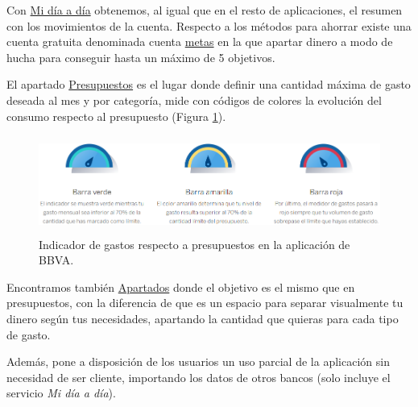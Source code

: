 \begin{itemize}
    Con 
    \href{https://www.bbva.es/personas/banca-online/control-gastos-mi-dia-a-dia.html}{Mi día a día}
    obtenemos, al igual que en el resto de aplicaciones, el resumen con los movimientos de la cuenta.
    Respecto a los métodos para ahorrar existe una cuenta gratuita denominada cuenta 
    \href{https://www.bbva.es/personas/productos/cuentas/cuenta-ahorro-metas.html#establece-tus-datos-de-contacto-y-acceso}{metas}
    en la que apartar dinero a modo de hucha para conseguir hasta un máximo de 5 objetivos. 

    El apartado 
    \href{https://www.bbva.es/general/salud-financiera/economia-domestica/gestor-de-gastos-y-presupuestos.html}{Presupuestos}
    es el lugar donde definir una cantidad máxima de gasto deseada 
    al mes y por categoría, mide con códigos de colores la evolución del consumo 
    respecto al presupuesto (Figura \ref{fig:indicador_presupuestos_BBVA}).
    
    \begin{figure}[ht!]
    \centering
    \includegraphics[height = 32mm]{imagenes/indicador_presupuestos_BBVA.png}
    \caption{Indicador de gastos respecto a presupuestos en la aplicación de BBVA.}
    \label{fig:indicador_presupuestos_BBVA}
    \end{figure}

    Encontramos también 
    \href{https://www.bbva.es/finanzas-vistazo/tu-guia-bbva/app/apartados-una-nueva-forma-de-ahorrar.html#:~:text=Apartados%2C%20de%20BBVA%2C%20es%20un,manera%20m%C3%A1s%20c%C3%B3moda%20y%20eficiente}{Apartados}
    donde el objetivo es el mismo que en presupuestos, con la diferencia de 
    que es un espacio para separar visualmente tu dinero según tus necesidades,
    apartando la cantidad que quieras para cada tipo de gasto.

    Además, pone a disposición de los usuarios un uso parcial de la aplicación sin necesidad 
    de ser cliente, importando los datos de otros bancos (solo incluye el 
    servicio \textit{Mi día a día}).

\end{itemize}

